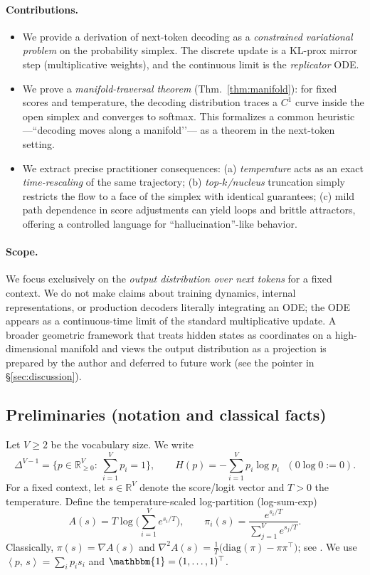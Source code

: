 \documentclass[11pt,reqno]{article}
\numberwithin{equation}{section}
\theoremstyle{plain}
\theoremstyle{definition}
\theoremstyle{remark}
\newcommand{\R}{\mathbb{R}}
\newcommand{\1}{\mathbbm{1}}
\newcommand{\ip}[2]{\left\langle #1,\, #2 \right\rangle}
\newcommand{\simplex}{\Delta^{V-1}}
\begin{document}
\paragraph{Contributions.}
\begin{itemize}
\item We provide a derivation of next-token decoding as a \emph{constrained
variational problem} on the probability simplex. The discrete update is a KL-prox mirror step
(multiplicative weights), and the continuous limit is the \emph{replicator} ODE.
\item We prove a \emph{manifold-traversal theorem} (Thm.~\ref{thm:manifold}): for fixed scores and
temperature, the decoding distribution traces a $C^1$ curve inside the open simplex and
converges to softmax. This formalizes a common heuristic—``decoding moves along a manifold’’—
as a theorem in the next-token setting.
\item We extract precise practitioner consequences: (a) \emph{temperature} acts as an exact
\emph{time-rescaling} of the same trajectory; (b) \emph{top-$k$/nucleus} truncation simply
restricts the flow to a face of the simplex with identical guarantees; (c) mild path dependence
in score adjustments can yield loops and brittle attractors, offering a controlled language for
``hallucination''-like behavior.
\end{itemize}

\paragraph{Scope.}We focus exclusively on the \emph{output distribution over next tokens} for a fixed context.
We do not make claims about training dynamics, internal representations, or production decoders
literally integrating an ODE; the ODE appears as a continuous-time limit of the standard
multiplicative update. A broader geometric framework that treats hidden states as coordinates
on a high-dimensional manifold and views the output distribution as a projection is prepared by
the author and deferred to future work (see the pointer in \S\ref{sec:discussion}).

\subsection{Preliminaries (notation and classical facts)}\label{subsec:preliminaries}
Let $V\ge 2$ be the vocabulary size. We write
\[
\simplex=\Big\{p\in\R^V_{\ge 0}:\ \sum_{i=1}^V p_i=1\Big\},\qquad
H(p)=-\sum_{i=1}^V p_i\log p_i\ \ \ (0\log 0:=0).
\]
For a fixed context, let $s\in\R^V$ denote the score/logit vector and $T>0$ the temperature.
Define the temperature-scaled log-partition (log-sum-exp)
\[
A(s)=T\log\!\Big(\sum_{i=1}^V e^{s_i/T}\Big),\qquad
\pi_i(s)=\frac{e^{s_i/T}}{\sum_{j=1}^V e^{s_j/T}}.
\]
Classically, $\pi(s)=\nabla A(s)$ and
$\nabla^2 A(s)=\tfrac{1}{T}\big(\mathrm{diag}(\pi)-\pi\pi^\top\big)$; see
\citet{jaynes1957information,cover2006elements,wainwright2008graphical,murphy2012ml}.
We use $\ip{p}{s}=\sum_i p_i s_i$ and $\1=(1,\dots,1)^\top$.
\end{document}

